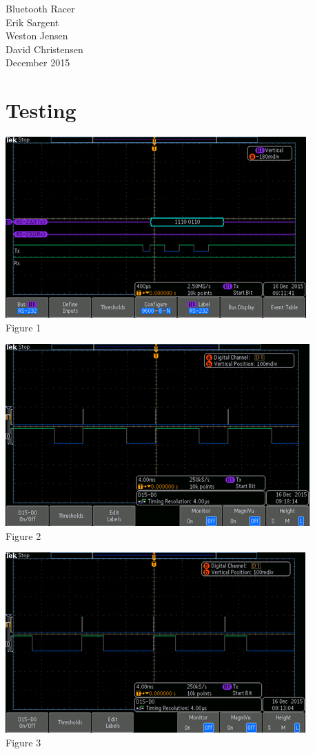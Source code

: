 \documentclass[12pt]{article}
\begin{document}
\begin{titlepage}
\begin {center}
\Huge Bluetooth Racer\\


\Large Erik Sargent\\
\Large Weston Jensen\\
\Large David Christensen\\
December 2015\\
\end {center}

\end{titlepage}


\tableofcontents
\newpage

\section{Testing}
\begin {center}
\includegraphics{uart-message}
\\
Figure 1
\end {center}
\begin {center}
\includegraphics{half-power}
\\
Figure 2
\end {center}
\begin {center}
\includegraphics{quarter-power}
\\
Figure 3
\end {center}
\end{document}
